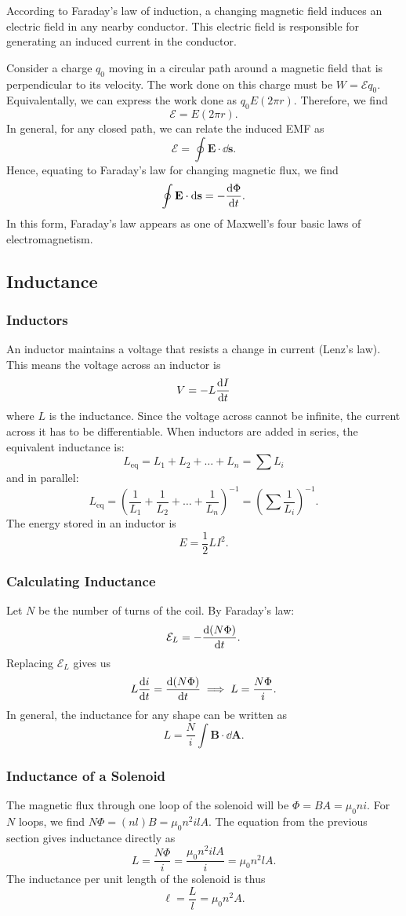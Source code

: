\documentclass[12pt]{article}
\let\vec\mathbf
\begin{document}
According to Faraday's law of induction, a changing magnetic field induces an electric field in any nearby conductor. This electric field is responsible for generating an induced current in the conductor.

Consider a charge $q_0$ moving in a circular path around a magnetic field that is perpendicular to its velocity. The work done on this charge must be $W = \mathcal{E}q_0$. Equivalentally, we can express the work done as $q_0 E (2\pi r).$ Therefore, we find 
\[\mathcal{E} = E (2\pi r).\]
In general, for any closed path, we can relate the induced EMF as 
\[\mathcal{E} = \oint \vec E \cdot \dd \vec s.\]
Hence, equating to Faraday's law for changing magnetic flux, we find 
\[\oint \vec E \cdot \dd \vec s = -\dv{\Phi}{t}.\]
In this form, Faraday's law appears as one of Maxwell's four basic laws of electromagnetism. 
  \subsection{Inductance}
  \subsubsection{Inductors}
  An inductor maintains a voltage that resists a change in current (Lenz's law). This means the voltage across an inductor is 
  \[V = -L \dv{I}{t}\]
  where $L$ is the inductance. Since the voltage across cannot be infinite, the current across it has to be differentiable. When
inductors are added in series, the equivalent inductance is:
\[L_{\text{eq}} = L_1 + L_2 + \dots + L_n = \sum L_i\]
and in parallel:
\[L_{\text{eq}} = \left(\frac{1}{L_1} + \frac{1}{L_2} + \dots + \frac{1}{L_n}\right)^{-1} = \left(\sum \frac{1}{L_i}\right)^{-1}.\]
The energy stored in an inductor is 
\[E = \frac{1}{2}LI^2.\]
\subsubsection{Calculating Inductance}
Let $N$ be the number of turns of the coil. By Faraday's law:
\[\mathcal{E}_L = -\dv{(N\Phi)}{t}.\]
Replacing $\mathcal{E}_L$ gives us
\[L\dv{i}{t} = \dv{(N \Phi)}{t} \implies L = \frac{N\Phi}{i}.\]
In general, the inductance for any shape can be written as 
\[L = \frac{N}{i} \int \vec B \cdot \dd \vec A.\]
\subsubsection{Inductance of a Solenoid}
The magnetic flux through one loop of the solenoid will be $\Phi = BA = \mu_0 ni$. For $N$ loops, we find $N\Phi = (nl) B = \mu_0 n^2 ilA$. The equation from the previous section gives inductance directly as 
\[L = \frac{N\Phi}{i} = \frac{\mu_0 n^2 ilA}{i} = \mu_0 n^2 lA.\]
The inductance per unit length of the solenoid is thus 
\[\ell = \frac{L}{l} = \mu_0 n^2 A.\]
\end{document}
